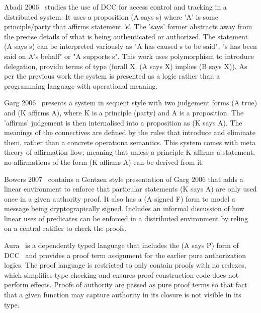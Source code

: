 Abadi 2006~\cite{Abadi2007:AccessControl} studies the use of DCC for access control and tracking in a distributed system. It uses a proposition (A says s) where 'A' is some principle/party that affirms statement 's'. The 'says' former abstracts away from the precise details of what is being authenticated or authorized. The statement (A says s) can be interpreted variously as "A has caused s to be said", "s has been said on A's behalf" or "A supports s". This work uses polymorphism to introduce delegation, providn terms of type (forall X. (A says X) implies (B says X)). As per the previous work \cite{Abadi1999:DCC} the system is presented as a logic rather than a programming language with operational meaning.

Garg 2006~\cite{Garg2006:Constructive} presents a system in sequent style with two judgement forms (A true) and (K affirms A), where K is a principle (party) and A is a proposition. The 'affirms' judgement is then internalised into a proposition as (K says A). The meanings of the connectives are defined by the rules that introduce and eliminate them, rather than a concrete operationa semantics. This system comes with meta theory of affirmation flow, meaning that unless a principle K affirms a statement, no affirmations of the form (K affirms A) can be derived from it.

Bowers 2007~\cite{Bowers2007:Consumable} contains a Gentzen style presentation of Garg 2006 that adds a linear environment to enforce that particular statements (K says A) are only used once in a given authority proof. It also has a (A signed F) form to model a message being cryptograpically signed. Includes an informal discussion of how linear uses of predicates can be enforced in a distributed environment by reling on a central ratifier to check the proofs.

Aura~\cite{Jia2008:Aura} is a dependently typed language that includes the (A says P) form of DCC~\cite{Abadi1999:DCC} and provides a proof term assignment for the earlier pure authorization logics. The proof language is restricted to only contain proofs with no redexes, which simplifies type checking and ensures proof construction code does not perform effects. Proofs of authority are passed as pure proof terms so that fact that a given function may capture authority in its closure is not visible in its type.

